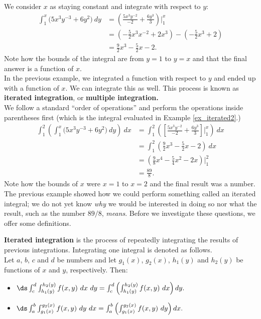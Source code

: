 {We consider $x$ as staying constant and integrate with respect to $y$:
\begin{align*}
\int_1^x\big(5x^3y^{-3}+6y^2\big)\ dy & = \left(\frac{5x^3y^{-2}}{-2}+\frac{6y^3}{3}\right)\Bigg|_1^x \\
						&= \left(-\frac52x^3x^{-2}+2x^3\right) - \left(-\frac52x^3+2\right) \\
						&= \frac92x^3-\frac52x-2.
\end{align*}
Note how the bounds of the integral are from $y=1$ to $y=x$ and that the final answer is a function of $x$.
}\\

In the previous example, we integrated a function with respect to $y$ and ended up with a function of $x$. We can integrate this as well. This process is known as \textbf{iterated integration}, or \textbf{multiple integration.}\\

{We follow a standard ``order of operations'' and perform the operations inside parentheses first (which is the integral evaluated in Example \ref{ex_iterated2}.)
\begin{align*}
\int_1^2\left(\int_1^x\big(5x^3y^{-3}+6y^2\big)\ dy\right)\ dx &= \int_1^2 \left(\left[\frac{5x^3y^{-2}}{-2}+\frac{6y^3}{3}\right]\Bigg|_1^x\right)\ dx \\
			&= \int_1^2 \left(\frac92x^3-\frac52x-2\right)\ dx \\
			&= \left(\frac98x^4-\frac54x^2-2x\right)\Bigg|_1^2\\
			&= \frac{89}8.
\end{align*}
Note how the bounds of $x$ were $x=1$ to $x=2$ and the final result was a number.
}\\

The previous example showed how we could perform something called an iterated integral; we do not yet know \textit{why} we would be interested in doing so nor what the result, such as the number $89/8$, \textit{means}. Before we investigate these questions, we offer some definitions.

{\textbf{Iterated integration} is the process of repeatedly integrating the results of previous integrations. Integrating one integral is denoted as follows.\\

Let $a$, $b$, $c$ and $d$ be numbers and let $g_1(x)$, $g_2(x)$, $h_1(y)$ and $h_2(y)$ be functions of $x$ and $y$, respectively. Then:
\begin{itemize}
	\item $\ds \int_c^d\int_{h_1(y)}^{h_2(y)} f(x,y)\ dx\ dy = \int_c^d\left(\int_{h_1(y)}^{h_2(y)} f(x,y)\ dx\right) dy.$
	\item $\ds \int_a^b\int_{g_1(x)}^{g_2(x)} f(x,y)\ dy\ dx = \int_a^b\left(\int_{g_1(x)}^{g_2(x)} f(x,y)\ dy\right) dx.$
\end{itemize}
}\\

